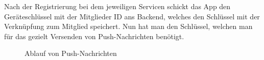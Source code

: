 Nach der Registrierung bei dem jeweiligen Servicen schickt das App den Geräteschlüssel mit der Mitglieder ID ans Backend, welches den Schlüssel mit der Verknüpfung zum Mitglied speichert. Nun hat man den Schlüssel, welchen man für das gezielt Versenden von Push-Nachrichten benötigt.
\begin{figure}[ht]
\centering
{}
\label{fig:app_settings}
\caption{Ablauf von Push-Nachrichten}
\end{figure}

